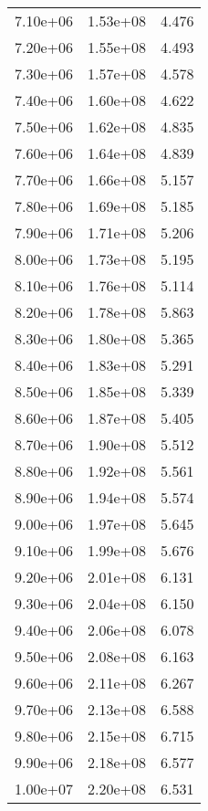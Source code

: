 \begin{table}
\begin{tabular}{lll}
7.10e+06 & 1.53e+08 & 4.476 \\
7.20e+06 & 1.55e+08 & 4.493 \\
7.30e+06 & 1.57e+08 & 4.578 \\
7.40e+06 & 1.60e+08 & 4.622 \\
7.50e+06 & 1.62e+08 & 4.835 \\
7.60e+06 & 1.64e+08 & 4.839 \\
7.70e+06 & 1.66e+08 & 5.157 \\
7.80e+06 & 1.69e+08 & 5.185 \\
7.90e+06 & 1.71e+08 & 5.206 \\
8.00e+06 & 1.73e+08 & 5.195 \\
8.10e+06 & 1.76e+08 & 5.114 \\
8.20e+06 & 1.78e+08 & 5.863 \\
8.30e+06 & 1.80e+08 & 5.365 \\
8.40e+06 & 1.83e+08 & 5.291 \\
8.50e+06 & 1.85e+08 & 5.339 \\
8.60e+06 & 1.87e+08 & 5.405 \\
8.70e+06 & 1.90e+08 & 5.512 \\
8.80e+06 & 1.92e+08 & 5.561 \\
8.90e+06 & 1.94e+08 & 5.574 \\
9.00e+06 & 1.97e+08 & 5.645 \\
9.10e+06 & 1.99e+08 & 5.676 \\
9.20e+06 & 2.01e+08 & 6.131 \\
9.30e+06 & 2.04e+08 & 6.150 \\
9.40e+06 & 2.06e+08 & 6.078 \\
9.50e+06 & 2.08e+08 & 6.163 \\
9.60e+06 & 2.11e+08 & 6.267 \\
9.70e+06 & 2.13e+08 & 6.588 \\
9.80e+06 & 2.15e+08 & 6.715 \\
9.90e+06 & 2.18e+08 & 6.577 \\
1.00e+07 & 2.20e+08 & 6.531 \\
\bottomrule
\end{tabular}
\end{table}
